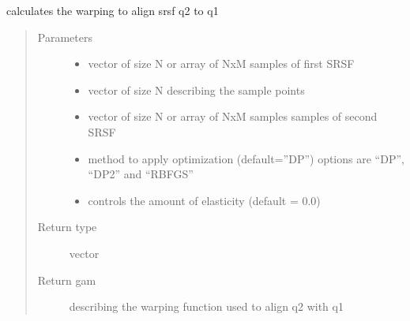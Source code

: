 \documentclass[letterpaper,10pt,english]{sphinxmanual}
\begin{document}
\begin{fulllineitems}
\label{\detokenize{utility_functions:utility_functions.optimum_reparam}}
calculates the warping to align srsf q2 to q1
\begin{quote}\begin{description}
\item[{Parameters}] \leavevmode\begin{itemize}
\item {} 
 \textendash{} vector of size N or array of NxM samples of first SRSF

\item {} 
 \textendash{} vector of size N describing the sample points

\item {} 
 \textendash{} vector of size N or array of NxM samples samples of second SRSF

\item {} 
 \textendash{} method to apply optimization (default=”DP”) options are “DP”, “DP2” and “RBFGS”

\item {} 
 \textendash{} controls the amount of elasticity (default = 0.0)

\end{itemize}

\item[{Return type}] \leavevmode
vector

\item[{Return gam}] \leavevmode
describing the warping function used to align q2 with q1

\end{description}\end{quote}

\end{fulllineitems}
\end{document}
